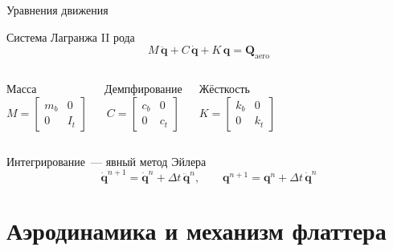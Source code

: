 \documentclass[9pt,aspectratio=169]{beamer}
\begin{document}
\begin{frame}{Уравнения движения}
  \begin{block}{Система Лагранжа II рода}
    \[
      M\,\ddot{\mathbf{q}} + C\,\dot{\mathbf{q}} + K\,\mathbf{q}
      = \mathbf{Q}_{\mathrm{aero}}
    \]
  \end{block}

  \medskip

  \begin{columns}[T]
      \begin{block}{Масса}
        \[
          M = \begin{bmatrix} m_b & 0 \\ 0 & I_t \end{bmatrix}
        \]
      \end{block}

      \begin{block}{Демпфирование}
        \[
          C = \begin{bmatrix} c_b & 0 \\ 0 & c_t \end{bmatrix}
        \]
      \end{block}

      \begin{block}{Жёсткость}
        \[
          K = \begin{bmatrix} k_b & 0 \\ 0 & k_t \end{bmatrix}
        \]
      \end{block}
  \end{columns}

  \medskip

  \begin{block}{Интегрирование~--- явный метод Эйлера}
    \[
      \dot{\mathbf{q}}^{n+1} = \dot{\mathbf{q}}^{n} + \Delta t\,\ddot{\mathbf{q}}^{n},
      \qquad
      \mathbf{q}^{n+1} = \mathbf{q}^{n} + \Delta t\,\dot{\mathbf{q}}^{n}
    \]
  \end{block}
\end{frame}

\section{Аэродинамика и механизм флаттера}
\end{document}
